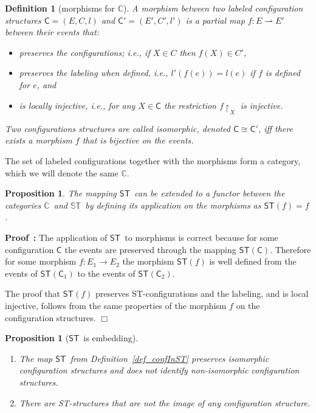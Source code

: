\documentclass[submission,copyright,creativecommons]{eptcs}
\newtheorem{proposition}[theorem]{Proposition}
\newtheorem{definition}[theorem]{Definition}
\newenvironment{proof}[1][\!\!\,]{\vspace{1ex}\noindent\textbf{Proof #1: }}{\hfill$\Box$\vspace{2ex}}
\newcommand\C{\ensuremath{\mathsf{C}}}
\newcommand\allC{\ensuremath{\mathbb{C}}}
\newcommand\allST{\ensuremath{\mathbb{ST}}}
\newcommand\isomorphic{\ensuremath{\cong}}
\newcommand\cintost{\ensuremath{\mathsf{ST}}}
\newcommand\restrictedToSet[1]{\ensuremath{\!\!\upharpoonright_{#1}}}
\begin{document}
\begin{definition}[morphisms for \allC]\label{def_morphisms_C}
A \emph{morphism} between two labeled configuration structures $\C=(E,C,l)$ and $\C'=(E',C',l')$ is a partial map $f:E\rightharpoonup E'$ between their events that: 
\vspace{-1ex}\begin{itemize}
\item 
preserves the configurations; i.e., if $X\in C$ then $f(X)\in C'$,
\item 
preserves the labeling when defined, i.e., $l'(f(e))=l(e)$ if $f$ is defined for $e$, and 
\item
is locally injective, i.e., for any $X\in\C$ the restriction $f\restrictedToSet{X}$ is injective.
\end{itemize} 
Two configurations structures are called \emph{isomorphic}, denoted $\C\isomorphic\C'$, iff there exists a morphism $f$ that is bijective on the events.
\end{definition}

The set of labeled configurations together with the morphisms form a category, which we will denote the same \allC.

\begin{proposition}\label{prop_functorExtension_cintost}
The mapping \cintost\ can be extended to a functor between the categories \allC\ and \allST\ by defining its application on the morphisms as $\cintost(f)=f$.
\end{proposition}

\begin{proof}
The application of \cintost\ to morphisms is correct because for some configuration $\C$ the events are preserved through the mapping $\cintost(\C)$. Therefore for some morphism $f:E_{1}\rightarrow E_{2}$ the morphism $\cintost(f)$ is well defined from the events of $\cintost(\C_{1})$ to the events of $\cintost(\C_{2})$.

The proof that $\cintost(f)$ preserves ST-configurations and the labeling, and is local injective, follows from the same properties of the morphism $f$ on the configuration structures.
\end{proof}



\begin{proposition}[\cintost\ is embedding]\label{prop_embeding_CtoST}
\ 

\begin{enumerate}
\item The map \cintost\ from Definition~\ref{def_confInST} preserves isomorphic configuration structures and does not identify non-isomorphic configuration structures.

\item There are ST-structures that are not the image of any configuration structure.
\end{enumerate}
\end{proposition}
\end{document}
